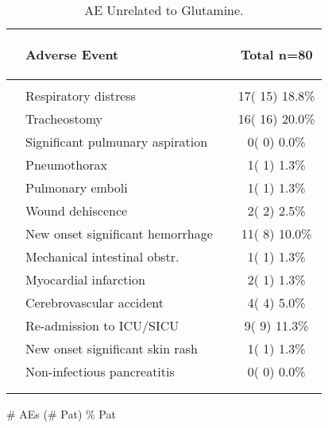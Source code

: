 \documentclass[dvips,10pt]{article}
\begin{document}
\begin{table}[t]
\caption
{ AE Unrelated to Glutamine. }
\begin{center}
\begin{tabular}{ @{}l@{}
@{}l@{}@{}p{1.5em}@{}@{}c@{}
}
\hline

& \parbox{6em}{\begin{center}Adverse Event\end{center}} && \parbox{6em}{\begin{center}Total n=80\end{center}} \\

\hline

\\
& Respiratory distress && 17( 15) 18.8\% \\
& Tracheostomy && 16( 16) 20.0\% \\
& Significant pulmunary aspiration && 0(  0)  0.0\% \\
& Pneumothorax && 1(  1)  1.3\% \\
& Pulmonary emboli && 1(  1)  1.3\% \\
& Wound dehiscence && 2(  2)  2.5\% \\
& New onset significant hemorrhage && 11(  8) 10.0\% \\
& 
Mechanical intestinal obstr. && 1(  1)  1.3\% \\
& Myocardial infarction && 2(  1)  1.3\% \\
& Cerebrovascular accident && 4(  4)  5.0\% \\
& Re-admission to ICU/SICU && 9(  9) 11.3\% \\
& New onset significant skin rash && 1(  1)  1.3\% \\
& 
Non-infectious pancreatitis && 0(  0)  0.0\% \\
\\
\hline \\

\end{tabular}


\parbox{ 5in }{ \# AEs (\# Pat) \% Pat } \\
 \vspace{1em}\end{center}
 \end{table}
\end{document}

